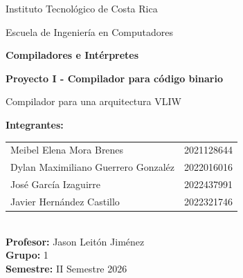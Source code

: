 \documentclass[12pt,letterpaper]{article}
\begin{document}
\begin{titlepage}
\centering
{\Large Instituto Tecnológico de Costa Rica\par}
\vspace{0.25cm}
{\large Escuela de Ingeniería en Computadores\par}
\vfill
\vfill
{\bfseries\LARGE Compiladores e Intérpretes\par}
\vspace{0.45cm}
{\bfseries\Large Proyecto I - Compilador para código binario \par}
\vspace{0.2cm}
{\large Compilador para una arquitectura VLIW\par}
\vfill
\begin{flushleft}
\textbf{Integrantes:}\\[0.20cm]
\begin{tabular}{@{}p{}l@{}}
Meibel Elena Mora Brenes & 2021128644\\
Dylan Maximiliano Guerrero Gonzaléz & 2022016016\\
José García Izaguirre & 2022437991\\
Javier Hernández Castillo & 2022321746\\
\end{tabular}\\[0.45cm]
\textbf{Profesor:} Jason Leitón Jiménez\\[0.15cm]
\textbf{Grupo:} 1\\[0.15cm]
\textbf{Semestre:} II Semestre 2026
\end{flushleft}
\vfill
\end{titlepage}
\tableofcontents
\clearpage

\end{document}
